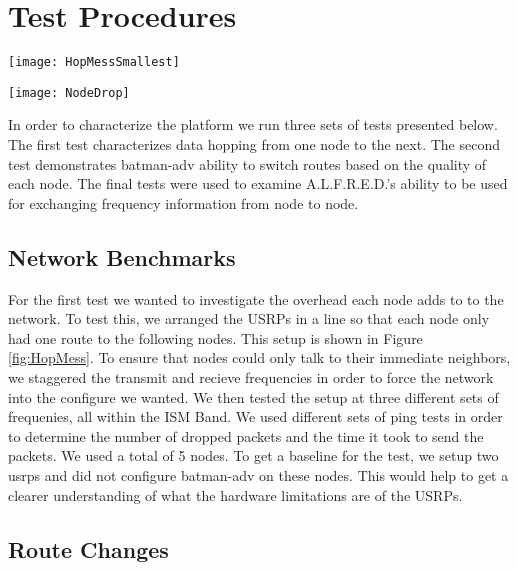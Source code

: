 \section{Test Procedures}


\begin{figure*}
	\centering
	\texttt{[image: HopMessSmallest]}
	\caption{The configuration used for the first set of tests.}
	\label{fig:HopMess}
\end{figure*}

\begin{figure*}
	\centering
	\texttt{[image: NodeDrop]}
	\caption{The configuration used for the second set of tests.}
	\label{fig:NodeDrop}
\end{figure*}

In order to characterize the platform we run three sets of tests presented below. The first test characterizes data hopping from one node to the next. The second test demonstrates batman-adv ability to switch routes based on the quality of each node. The final tests were used to examine A.L.F.R.E.D.'s ability to be used for exchanging frequency information from node to node. 

\subsection{Network Benchmarks}



For the first test we wanted to investigate the overhead each node adds to to the network. To test this, we arranged the USRPs in a line so that each node only had one route to the following nodes. This setup is shown in Figure \ref{fig:HopMess}. To ensure that nodes could only talk to their immediate neighbors, we staggered the transmit and recieve frequencies in order to force the network into the configure we wanted. We then tested the setup at three different sets of frequenies, all within the ISM Band. We used different sets of ping tests in order to determine the number of dropped packets and the time it took to send the packets. We used a total of 5 nodes. To get a baseline for the test, we setup two usrps and did not configure batman-adv on these nodes. This would help to get a clearer understanding of what the hardware limitations are of the USRPs. 


\subsection{Route Changes}

